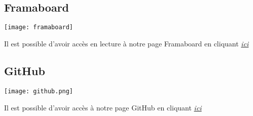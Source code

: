 ~\\
~\\

\subsection{Framaboard}
\begin{center}
\texttt{[image: framaboard]}
\end{center}
Il est possible d'avoir accès en lecture à notre page Framaboard en cliquant  \textit{\href{https://smart.framaboard.org/?controller=board&action=readonly&token=ab1e20bb26472df067dc24cbd84d9b28eea71bfd68bdea07ab5a9b555ce0}{ici}}

\subsection{GitHub}
\begin{center}
\texttt{[image: github.png]}
\end{center}
Il est possible d'avoir accès à notre page GitHub en cliquant  \textit{\href{https://github.com/magichal/SMART}{ici}}






  


